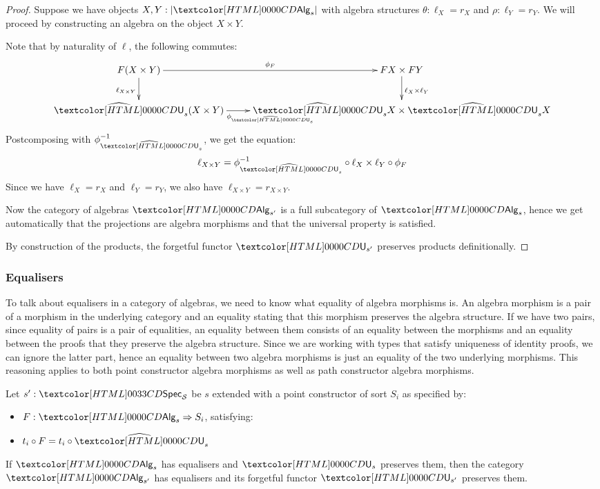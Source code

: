 \begin{proof}
  Suppose we have objects $X, Y : | \Alg_s |$ with algebra structures
  $\theta : \ell_X = r_X$ and $\rho : \ell_Y = r_Y$. We will proceed by
  constructing an algebra on the object $X \times Y$.

  Note that by naturality of $\ell$, the following commutes:
  $$
  \xymatrix{
    F(X \times Y) \ar[r]^{\phi_F} \ar[d]_{\ell_{X \times Y}} &FX \times FY \ar[d]^{\ell_X \times \ell_Y} \\
    \extendfunc{\Und}_s(X \times Y) \ar[r]_{\phi_{\extendfunc{\Und}_s}} &\extendfunc{\Und}_s X \times \extendfunc{\Und}_s X
  }
  $$
  Postcomposing with $\phi_{\extendfunc{\Und}_s}^{-1}$, we get the equation:
  $$
  \ell_{X \times Y} = \phi_{\extendfunc{\Und}_s}^{-1} \circ \ell_X \times \ell_Y \circ \phi_F
  $$
  Since we have $\ell_X = r_X$ and $\ell_Y = r_Y$, we also have
  $\ell_{X \times Y} = r_{X \times Y}$.

  Now the category of algebras $\Alg_{s'}$ is a full subcategory of
  $\Alg_s$, hence we get automatically that the projections are
  algebra morphisms and that the universal property is satisfied.

  By construction of the products, the forgetful functor
  $\Und_{s'}$ preserves products definitionally.
\end{proof}

\subsubsection{Equalisers}

To talk about equalisers in a category of algebras, we need to know
what equality of algebra morphisms is. An algebra morphism is a pair
of a morphism in the underlying category and an equality stating that
this morphism preserves the algebra structure. If we have two pairs,
since equality of pairs is a pair of equalities, an equality between
them consists of an equality between the morphisms and an equality
between the proofs that they preserve the algebra structure. Since we
are working with types that satisfy uniqueness of identity proofs, we
can ignore the latter part, hence an equality between two algebra
morphisms is just an equality of the two underlying morphisms. This
reasoning applies to both point constructor algebra morphisms as well as
path constructor algebra morphisms.

\begin{lemma}
  Let $s' : \specty_\Ss$ be $s$ extended with a point constructor of sort
  $S_i$ as specified by:
  \begin{itemize}
  \item $F : \Func{\Alg_s}{S_i}$, satisfying:
  \item $t_i \circ F = t_i \circ \extendfunc{\Und}_s$
  \end{itemize}

  If $\Alg_s$ has equalisers and $\Und_s$ preserves them, then the category
  $\Alg_{s'}$ has equalisers and its forgetful functor $\Und_{s'}$
  preserves them.
\end{lemma}

